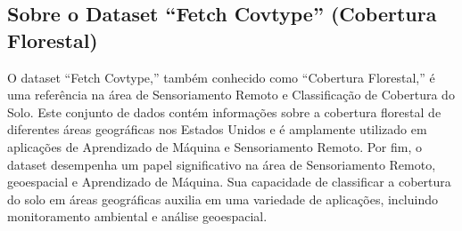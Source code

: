 \documentclass[11pt]{article}
\begin{document}
    \hypertarget{sobre-o-dataset-fetch-covtype-cobertura-florestal}{%
\subsection{Sobre o Dataset ``Fetch Covtype'' (Cobertura
Florestal)}\label{sobre-o-dataset-fetch-covtype-cobertura-florestal}}

O dataset ``Fetch Covtype,'' também conhecido como ``Cobertura
Florestal,'' é uma referência na área de Sensoriamento Remoto e
Classificação de Cobertura do Solo. Este conjunto de dados contém
informações sobre a cobertura florestal de diferentes áreas geográficas
nos Estados Unidos e é amplamente utilizado em aplicações de Aprendizado
de Máquina e Sensoriamento Remoto. Por fim, o dataset desempenha um
papel significativo na área de Sensoriamento Remoto, geoespacial e
Aprendizado de Máquina. Sua capacidade de classificar a cobertura do
solo em áreas geográficas auxilia em uma variedade de aplicações,
incluindo monitoramento ambiental e análise geoespacial.
\end{document}
